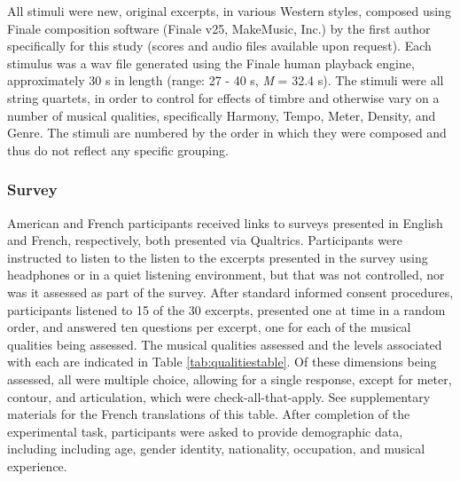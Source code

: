 \documentclass[
  english,
  man,floatsintext]{apa6}
\begin{document}
All stimuli were new, original excerpts, in various Western styles, composed using Finale composition software (Finale v25, MakeMusic, Inc.) by the first author specifically for this study (scores and audio files available upon request). Each stimulus was a wav file generated using the Finale human playback engine, approximately 30 s in length (range: 27 - 40 s, \emph{M} = 32.4 s). The stimuli were all string quartets, in order to control for effects of timbre and otherwise vary on a number of musical qualities, specifically Harmony, Tempo, Meter, Density, and Genre. The stimuli are numbered by the order in which they were composed and thus do not reflect any specific grouping.

\hypertarget{survey}{%
\subsubsection{Survey}\label{survey}}

American and French participants received links to surveys presented in English and French, respectively, both presented via Qualtrics. Participants were instructed to listen to the listen to the excerpts presented in the survey using headphones or in a quiet listening environment, but that was not controlled, nor was it assessed as part of the survey. After standard informed consent procedures, participants listened to 15 of the 30 excerpts, presented one at time in a random order, and answered ten questions per excerpt, one for each of the musical qualities being assessed. The musical qualities assessed and the levels associated with each are indicated in Table \ref{tab:qualitiestable}. Of these dimensions being assessed, all were multiple choice, allowing for a single response, except for meter, contour, and articulation, which were check-all-that-apply. See supplementary materials for the French translations of this table. After completion of the experimental task, participants were asked to provide demographic data, including including age, gender identity, nationality, occupation, and musical experience.
\end{document}
